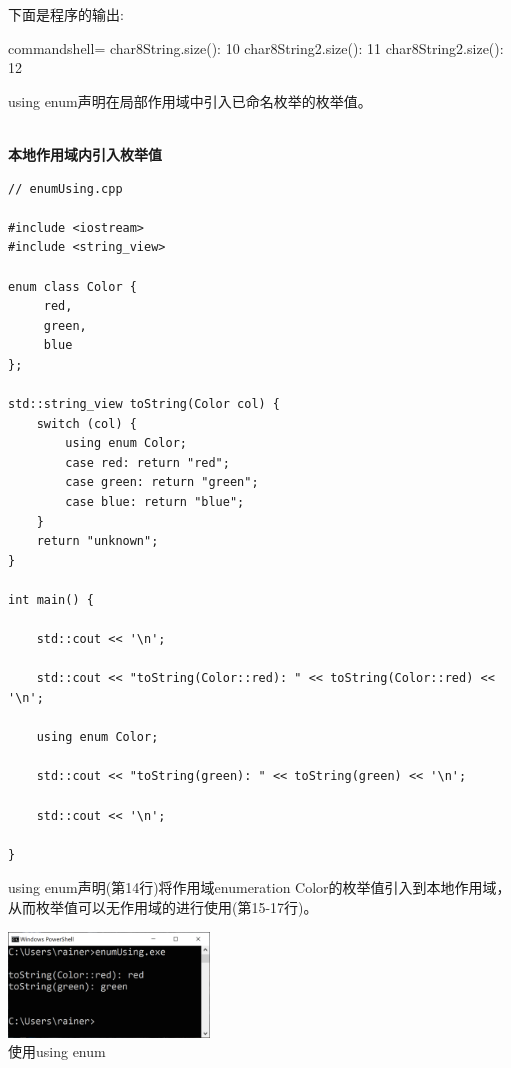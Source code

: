 下面是程序的输出:

\begin{tcblisting}{commandshell={}}
char8String.size(): 10
char8String2.size(): 11
char8String2.size(): 12
\end{tcblisting}


using enum声明在局部作用域中引入已命名枚举的枚举值。

\hspace*{\fill} \\ %
\noindent
\textbf{本地作用域内引入枚举值}
\begin{lstlisting}[style=styleCXX]
// enumUsing.cpp

#include <iostream>
#include <string_view>

enum class Color {
	 red,
	 green,
	 blue
};

std::string_view toString(Color col) {
	switch (col) {
		using enum Color;
		case red: return "red";
		case green: return "green";
		case blue: return "blue";
	}
	return "unknown";
}

int main() {

	std::cout << '\n';
	
	std::cout << "toString(Color::red): " << toString(Color::red) << '\n';
	
	using enum Color;
	
	std::cout << "toString(green): " << toString(green) << '\n';
	
	std::cout << '\n';

}
\end{lstlisting}

using enum声明(第14行)将作用域enumeration Color的枚举值引入到本地作用域，从而枚举值可以无作用域的进行使用(第15-17行)。

\begin{center}
\includegraphics[width=0.4\textwidth]{content/3/chapter4/images/48.png}\\
使用using enum
\end{center}


